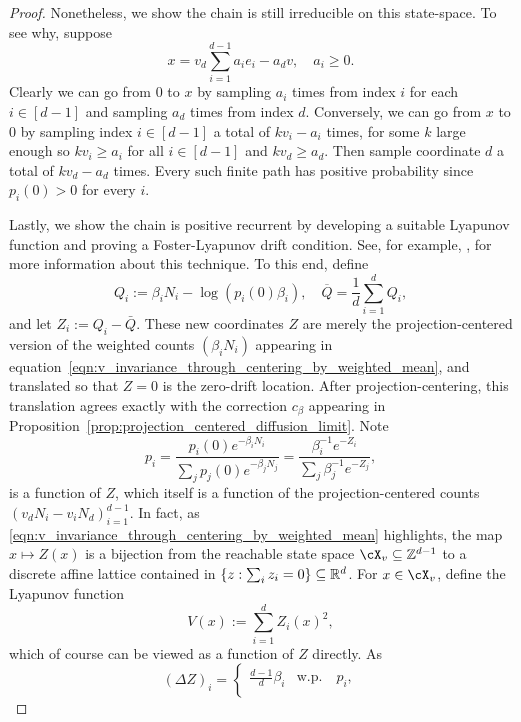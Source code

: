 \begin{subappendices}
\begin{proof}
        Nonetheless, we show the chain is still irreducible on this state-space. To see why, suppose
        \[x = v_d\sum_{i=1}^{d-1} a_i e_i - a_d v, \quad a_i \geq 0.\]
        \noindent Clearly we can go from $0$ to $x$ by sampling $a_i$ times from index $i$ for each $i \in [d-1]$ and sampling $a_d$ times
        from index $d$. Conversely, we can go from $x$ to $0$ by sampling index $i \in [d-1]$ a total of $k v_i - a_i$ times, for some $k$ large enough so $k v_i \geq a_i$ for all $i \in [d - 1]$ and $kv_d \geq a_d$.
        Then sample coordinate $d$ a total of $k v_d - a_d$ times. Every such finite path has positive probability since $p_i(0)>0$ for every $i$.

        Lastly, we show the chain is positive recurrent by developing a suitable Lyapunov function and
        proving a Foster-Lyapunov drift condition. See, for example, \cite[Theorem 11.3.4]{meyn2009_markov_chains_stochastic_stability},
        for more information about this technique. To this end, define
        \[Q_i := \beta_i N_i - \log(p_i(0) \beta_i), \quad \overline{Q} = \frac{1}{d} \sum_{i=1}^{d} Q_i,\]
        \noindent and let $Z_i := Q_i - \bar{Q}$. These new coordinates $Z$ are merely the projection-centered version of
        the weighted counts $(\beta_iN_i)$ appearing in equation~\eqref{eqn:v_invariance_through_centering_by_weighted_mean},
        and translated so that $Z=0$ is the zero-drift location. After projection-centering, this translation agrees
        exactly with the correction $c_\beta$ appearing in Proposition~\ref{prop:projection_centered_diffusion_limit}. Note
        \[p_i = \frac{p_i(0)e^{-\beta_i N_i}}{\sum_j p_j(0)e^{-\beta_j N_j}} = \frac{\beta_i^{-1} e^{-Z_i}}{\sum_j \beta_j^{-1} e^{-Z_j}},\]
        \noindent is a function of $Z$, which itself is a function of the projection-centered counts $(v_d N_i - v_i N_d)_{i=1}^{d-1}$.
        In fact, as \eqref{eqn:v_invariance_through_centering_by_weighted_mean} highlights, the map $x \mapsto Z(x)$
        is a bijection from the reachable state space $\cX_v\subseteq\Z^{d-1}$ to a discrete affine lattice contained in $\{z : \sum_i z_i = 0\}\subseteq\mathbb{R}^d$.
        For $x \in \cX_v$, define the Lyapunov function
        \[V(x) := \sum_{i=1}^{d} Z_i(x)^2,\]
        \noindent which of course can be viewed as a function of $Z$ directly. As
        \[(\Delta Z)_i = \begin{cases}
            \frac{d-1}{d}\beta_i & \mathrm{w.p.} \quad p_i, \\

\end{cases}\]
\end{proof}
\end{subappendices}
